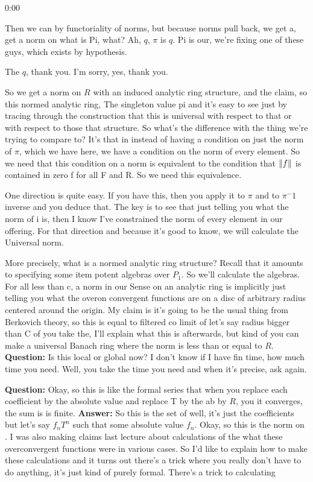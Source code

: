 \begin{unfinished}{0:00}
{Then we can by functoriality of norms, but because norms pull back, we get a, get a norm on what is Pi, what? Ah, $q$, $\pi$ is $q$. Pi is our, we're fixing one of these guys, which exists by hypothesis.

The $q$, thank you. I'm sorry, yes, thank you.

So we get a norm on $R$ with an induced analytic ring structure, and the claim, so this normed analytic ring,
The singleton value pi and it's easy to see just by tracing through the construction that this is universal with respect to that or with respect to those that structure. So what's the difference with the thing we're trying to compare to? It's that in instead of having a condition on just the norm of $\pi$, which we have here, we have a condition on the norm of every element. So we need that this condition on a norm is equivalent to the condition that $\| f \|$ is contained in zero f for all F and R. So we need this equivalence.

One direction is quite easy. If you have this, then you apply it to $\pi$ and to $\pi^-1$ inverse and you deduce that. The key is to see that just telling you what the norm of i is, then I know I've constrained the norm of every element in our offering. For that direction and because it's good to know, we will calculate the Universal norm.

More precisely, what is a normed analytic ring structure? Recall that it amounts to specifying some item potent algebras over $P_1$. So we'll calculate the algebras. For all less than c, a norm in our Sense on an analytic ring is implicitly just telling you what the overon convergent functions are on a disc of arbitrary radius centered around the origin. My claim is it's going to be the usual thing from Berkovich theory, so this is equal to filtered co limit of let's say radius bigger than C of you take the, I'll explain what this is afterwards, but kind of you can make a universal Banach ring where the norm is less than or equal to $R$.
\textbf{Question:} Is this local or global now? I don't know if I have fin time, how much time you need. Well, you take the time you need and when it's precise, ask again.

\textbf{Question:} Okay, so this is like the formal series that when you replace each coefficient by the absolute value and replace T by the ab by $R$, you it converges, the sum is is finite. 
\textbf{Answer:} So this is the set of well, it's just the coefficients but let's say $f_n T^{n}$ such that some absolute value $f_n$. 
Okay, so this is the norm on . I was also making claims last lecture about calculations of the what these overconvergent functions were in various cases. So I'd like to explain how to make these calculations and it turns out there's a trick where you really don't have to do anything, it's just kind of purely formal.
There's a trick to calculating
 
}
\end{unfinished}
